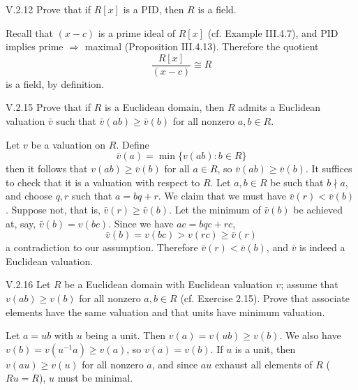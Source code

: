 \begin{problem}{V.2.12}
Prove that if $R[x]$ is a PID, then $R$ is a field.
\end{problem}
\begin{pf}
Recall that $(x-c)$ is a prime ideal of $R[x]$ (cf. Example III.4.7), and PID implies prime $\Rightarrow$ maximal (Proposition III.4.13). Therefore the quotient
\[
\frac{R[x]}{(x-c)} \cong R
\]
is a field, by definition.
\end{pf}

\begin{problem}{V.2.15}
Prove that if $R$ is a Euclidean domain, then $R$ admits a Euclidean valuation $\bar{v}$ such that $\bar{v}(ab) \geq \bar{v}(b)$ for all nonzero $a,b \in R$.
\end{problem}
\begin{pf}
Let $v$ be a valuation on $R$. Define 
\[
\bar{v}(a) = \min\{v(ab): b \in R\}
\]
then it follows that $v(ab) \geq \bar{v}(b)$ for all $a \in R$, so $\bar{v}(ab) \geq \bar{v}(b)$. It suffices to check that it is a valuation with respect to $R$. Let $a,b \in R$ be such that $b \nmid a$, and choose $q,r$ such that $a = bq+r$. We claim that we must have $\bar{v}(r) < \bar{v}(b)$. Suppose not, that is, $\bar{v}(r) \geq \bar{v}(b)$. Let the minimum of $\bar{v}(b)$ be achieved at, say, $\bar{v}(b) = v(bc)$. Since we have $ac = bqc+rc$,
\[
\bar{v}(b) = v(bc) > v(rc) \geq \bar{v}(r) 
\]
a contradiction to our assumption. Therefore $\bar{v}(r) < \bar{v}(b)$, and $\bar{v}$ is indeed a Euclidean valuation.
\end{pf}

\begin{problem}{V.2.16}
Let $R$ be a Euclidean domain with Euclidean valuation $v$; assume that $v(ab) \geq v(b)$ for all nonzero $a,b \in R$ (cf. Exercise 2.15). Prove that associate elements have the same valuation and that units have minimum valuation.
\end{problem}
\begin{pf}
Let $a = ub$ with $u$ being a unit. Then $v(a) = v(ub) \geq v(b)$. We also have $v(b) = v(u^{-1}a) \geq v(a)$, so $v(a) = v(b)$. If $u$ is a unit, then $v(au) \geq v(u)$ for all nonzero $a$, and since $au$ exhaust all elements of $R$ ($Ru = R$), $u$ must be minimal.
\end{pf}

